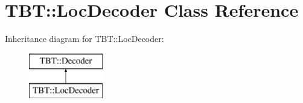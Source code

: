\hypertarget{classTBT_1_1LocDecoder}{}\section{T\+BT\+:\+:Loc\+Decoder Class Reference}
\label{classTBT_1_1LocDecoder}
Inheritance diagram for T\+BT\+:\+:Loc\+Decoder\+:\begin{figure}[H]
\begin{center}
\leavevmode
\includegraphics[height=2.000000cm]{classTBT_1_1LocDecoder}
\end{center}
\end{figure}
